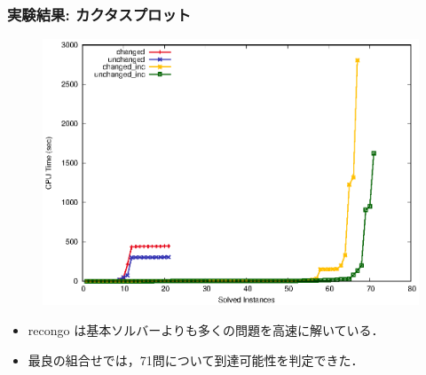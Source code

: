 \documentclass[dvipdfmx,11pt]{beamer}
\begin{document}
\begin{frame}\frametitle{実験結果: カクタスプロット}

  \begin{figure}[h]
    \centering
    \includegraphics[scale=0.7]{fig/cactus.eps}
  \end{figure}

  \begin{itemize}
    \item recongo は基本ソルバーよりも多くの問題を高速に解いている．
    \item 最良の組合せでは，71問について到達可能性を判定できた．
  \end{itemize}
  
\end{frame}
\end{document}
